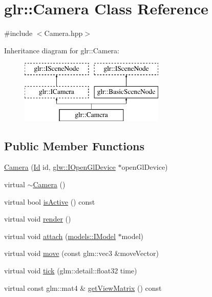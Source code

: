 \hypertarget{classglr_1_1Camera}{\section{glr\-:\-:Camera Class Reference}
\label{classglr_1_1Camera}
}


{\ttfamily \#include $<$Camera.\-hpp$>$}

Inheritance diagram for glr\-:\-:Camera\-:\begin{figure}[H]
\begin{center}
\leavevmode
\includegraphics[height=3.000000cm]{classglr_1_1Camera}
\end{center}
\end{figure}
\subsection*{Public Member Functions}
\begin{DoxyCompactItemize}
\item 
\hyperlink{classglr_1_1Camera_ab689113f144d6a5fbf348a2ba931abe0}{Camera} (\hyperlink{classglr_1_1Id}{Id} id, \hyperlink{classglr_1_1glw_1_1IOpenGlDevice}{glw\-::\-I\-Open\-Gl\-Device} $\ast$open\-Gl\-Device)
\item 
virtual \hyperlink{classglr_1_1Camera_a54d1ec94eb64285d11f606d67868a586}{$\sim$\-Camera} ()
\item 
virtual bool \hyperlink{classglr_1_1Camera_a65d8b56d81780505c23ec6fde2724907}{is\-Active} () const 
\item 
virtual void \hyperlink{classglr_1_1Camera_a4f7ff6087032b0aa9a1e375183ecdfce}{render} ()
\item 
virtual void \hyperlink{classglr_1_1Camera_ae5a0e585b32aba839e203134783ff529}{attach} (\hyperlink{classglr_1_1models_1_1IModel}{models\-::\-I\-Model} $\ast$model)
\item 
virtual void \hyperlink{classglr_1_1Camera_adb4a6f36fe1f647d472e2b5e3344c45c}{move} (const glm\-::vec3 \&move\-Vector)
\item 
virtual void \hyperlink{classglr_1_1Camera_ab31a49d330cd684db736c4982b0bad00}{tick} (glm\-::detail\-::float32 time)
\item 
virtual const glm\-::mat4 \& \hyperlink{classglr_1_1Camera_a4cd3b91456a3724296a1440995f3529a}{get\-View\-Matrix} () const 
\end{DoxyCompactItemize}
